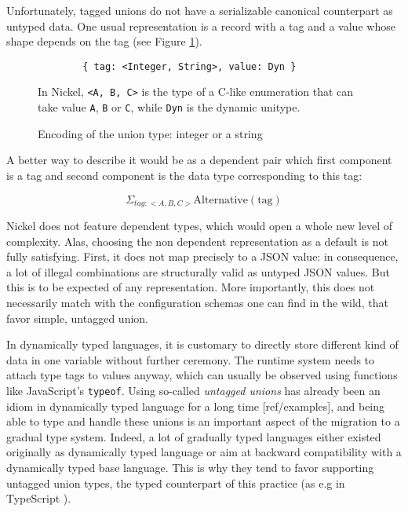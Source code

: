 \documentclass{article}
\begin{document}
Unfortunately, tagged unions do not have a serializable canonical counterpart as
untyped data. One usual representation is a record with a tag and a value whose
shape depends on the tag (see Figure \ref{fig:union-encoding}).

\begin{figure}
  \begin{center}
    \begin{lstlisting}
        { tag: <Integer, String>, value: Dyn }
    \end{lstlisting}
  \end{center}
\caption{Encoding of the union type: integer or a string}
\label{fig:union-encoding}
\medskip
\small
In Nickel, \lstinline+<A, B, C>+ is the type of a C-like enumeration that can
take value \lstinline+A+, \lstinline+B+ or \lstinline+C+, while \lstinline+Dyn+
is the dynamic unitype.
\end{figure}

A better way to describe it would be as a dependent pair which first component
is a tag and second component is the data type corresponding to this tag:

\[
    \Sigma_{tag : <A, B, C>} \text{Alternative}(\text{tag})
\]

Nickel does not feature dependent types, which would open a whole new level of
complexity. Alas, choosing the non dependent representation as a default is not
fully satisfying.  First, it does not map precisely to a JSON value: in
consequence, a lot of illegal combinations are structurally valid as untyped
JSON values. But this is to be expected of any representation. More importantly,
this does not necessarily match with the configuration schemas one can find in
the wild, that favor simple, untagged union.

In dynamically typed languages, it is customary to directly store different kind
of data in one variable without further ceremony. The runtime system needs to
attach type tags to values anyway, which can usually be observed using functions
like JavaScript's \verb+typeof+. Using so-called \emph{untagged unions} has
already been an idiom in dynamically typed language for a long time
[ref/examples], and being able to type and handle these unions is an important
aspect of the migration to a gradual type system. Indeed, a lot of gradually
typed languages either existed originally as dynamically typed language or aim
at backward compatibility with a dynamically typed base language. This is why
they tend to favor supporting untagged union types, the typed counterpart of
this practice (as e.g in TypeScript \cite{TypeScriptUnions}).
\end{document}
